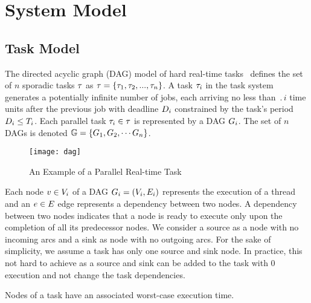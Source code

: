\section{System Model}

\subsection{Task Model}
The directed acyclic graph (DAG) model of hard real-time
tasks~\addcite{} defines the set of ${n}$ sporadic tasks $\tau$ as
$\tau{} = \{\tau_{1},\tau_{2}, ..., \tau_{n}\}$. A task $\tau_{i}$
in the task system generates a potentially infinite number of jobs,
each arriving no less than $\period{i}$ time units after the previous
job with deadline ${D_{i}}$ constrained by the task's period
$D_{i} \leq T_{i}$. Each parallel task $\tau_{i} \in
\tau$ is represented by a DAG ${\Dag{i}}$. The set of ${n}$ DAGs is
denoted ${\dagset = \{\Dag{1}, \Dag{2}, \cdots \Dag{n}\}}$.

\begin{figure}[!h]
  \centering
  \texttt{[image: dag]}
  \caption{An Example of a Parallel Real-time Task}
  \label{fig:dag}
\end{figure}

Each node ${\node{1} \in \nodeset{i}}$ of a DAG ${\Dag{i} = (\nodeset{i}, \edgeset{i})}$ represents the
execution of a thread and an ${\edge \in \edgeset{}}$ edge represents a
dependency between two nodes. A dependency between two nodes indicates
that a node is ready to execute only upon the completion of all its
predecessor nodes. We consider a source as a node with no incoming
arcs and a sink as node with no outgoing arcs. For the sake of
simplicity, we assume a task has only one source and sink node. In
practice, this not hard to achieve as a source and sink can be added
to the task with $0$ execution and not change the task dependencies.

Nodes of a task have an associated worst-case execution time. 

